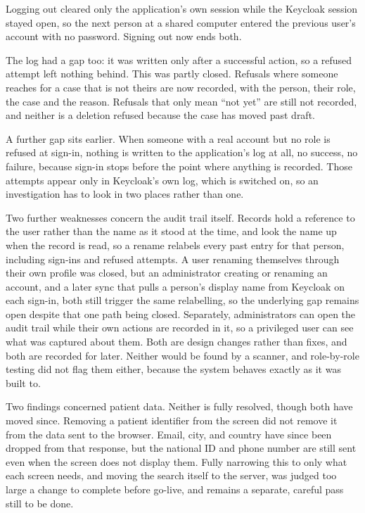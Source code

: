 Logging out cleared only the application's own session while the Keycloak session stayed open, so the next person at a shared computer entered the previous user's account with no password. Signing out now ends both.

The log had a gap too: it was written only after a successful action, so a refused attempt left nothing behind. This was partly closed. Refusals where someone reaches for a case that is not theirs are now recorded, with the person, their role, the case and the reason. Refusals that only mean ``not yet'' are still not recorded, and neither is a deletion refused because the case has moved past draft.

A further gap sits earlier. When someone with a real account but no role is refused at sign-in, nothing is written to the application's log at all, no success, no failure, because sign-in stops before the point where anything is recorded. Those attempts appear only in Keycloak's own log, which is switched on, so an investigation has to look in two places rather than one.

Two further weaknesses concern the audit trail itself. Records hold a reference to the user rather than the name as it stood at the time, and look the name up when the record is read, so a rename relabels every past entry for that person, including sign-ins and refused attempts. A user renaming themselves through their own profile was closed, but an administrator creating or renaming an account, and a later sync that pulls a person's display name from Keycloak on each sign-in, both still trigger the same relabelling, so the underlying gap remains open despite that one path being closed. Separately, administrators can open the audit trail while their own actions are recorded in it, so a privileged user can see what was captured about them. Both are design changes rather than fixes, and both are recorded for later. Neither would be found by a scanner, and role-by-role testing did not flag them either, because the system behaves exactly as it was built to.

Two findings concerned patient data. Neither is fully resolved, though both have moved since. Removing a patient identifier from the screen did not remove it from the data sent to the browser. Email, city, and country have since been dropped from that response, but the national ID and phone number are still sent even when the screen does not display them. Fully narrowing this to only what each screen needs, and moving the search itself to the server, was judged too large a change to complete before go-live, and remains a separate, careful pass still to be done.

